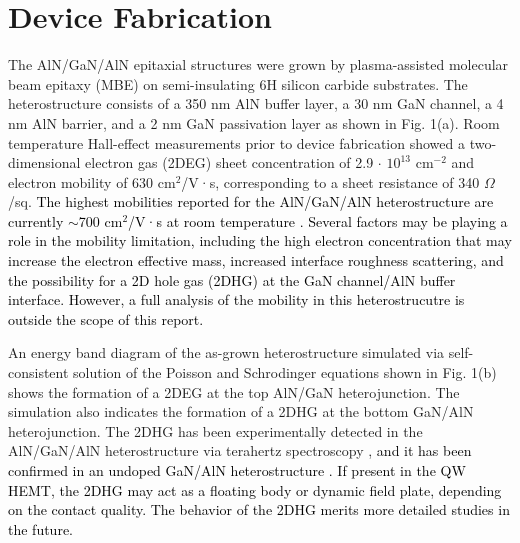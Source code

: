 \documentclass[journal]{IEEEtran}
\begin{document}
\section{Device Fabrication}
The AlN/GaN/AlN epitaxial structures were grown by plasma-assisted molecular beam epitaxy (MBE) on semi-insulating 6H silicon carbide substrates. The heterostructure consists of a 350 nm AlN buffer layer, a 30 nm GaN channel, a 4 nm AlN barrier, and a 2 nm GaN passivation layer as shown in Fig. 1(a). Room temperature Hall-effect measurements prior to device fabrication showed a two-dimensional electron gas (2DEG) sheet concentration of 2.9 $\cdot$ $\mathrm{10^{13}}$ $\mathrm{cm^{-2}}$ and electron mobility of 630 $\mathrm{cm^2}$/V·s, corresponding to a sheet resistance of 340 $\Omega$/sq.  \textcolor{black}{The highest mobilities reported for the AlN/GaN/AlN heterostructure are currently $\sim$700 $\mathrm{cm^2}$/V·s at room temperature \cite{Wang2012,Islam2016,Song2017,Rennesson2018}. Several factors may be playing a role in the mobility limitation, including the high electron concentration that may increase the electron effective mass, increased interface roughness scattering, and the possibility for a 2D hole gas (2DHG) at the GaN channel/AlN buffer interface. However, a full analysis of the mobility in this heterostrucutre is outside the scope of this report.}

An energy band diagram of the as-grown heterostructure simulated via self-consistent solution of the Poisson and Schrodinger equations \cite{Tan1990} shown in Fig. 1(b) shows the formation of a 2DEG at the top AlN/GaN heterojunction. The simulation also indicates the formation of a 2DHG at the bottom GaN/AlN heterojunction. The 2DHG has been experimentally detected in the AlN/GaN/AlN heterostructure via terahertz spectroscopy \cite{Jena2017}, \textcolor{black}{and it has been confirmed in an undoped GaN/AlN heterostructure \cite{Chaudhuri2018}. If present in the QW HEMT, the 2DHG may act as a floating body or dynamic field plate, depending on the contact quality. The behavior of the 2DHG merits more detailed studies in the future.}
\end{document}
